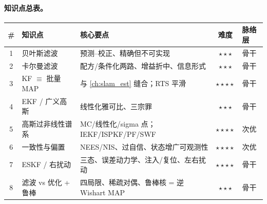 \paragraph{知识点总表。}
\begin{table}[ht]\centering\small
\begin{tabular}{cllcl}
\toprule
\# & 知识点 & 核心要点 & 难度 & 脉络层 \\
\midrule
1 & 贝叶斯滤波 & 预测–校正、精确但不可实现 & $\star\star\star$ & 骨干 \\
2 & 卡尔曼滤波 & 配方/条件化两路、增益折中、信息形式 & $\star\star\star$ & 骨干 \\
3 & KF $\equiv$ 批量 MAP & 与 \cref{ch:slam_est} 缝合；RTS 平滑 & $\star\star\star\star$ & 骨干 \\
4 & EKF / 广义高斯 & 线性化雅可比、三宗罪 & $\star\star\star$ & 骨干 \\
5 & 高斯过非线性谱系 & MC/线性化/sigma 点；IEKF/ISPKF/PF/SWF & $\star\star\star\star$ & 次优 \\
6 & 一致性与偏置 & NEES/NIS、过自信、状态增广可观测性 & $\star\star\star\star$ & 次优 \\
7 & ESKF / 右扰动 & 三态、误差动力学、注入/复位、左右扰动 & $\star\star\star\star$ & 骨干 \\
8 & 滤波 vs 优化 + 鲁棒 & 四局限、稀疏对偶、鲁棒核 = 逆 Wishart MAP & $\star\star\star$ & 骨干 \\
\bottomrule
\end{tabular}
\end{table}

